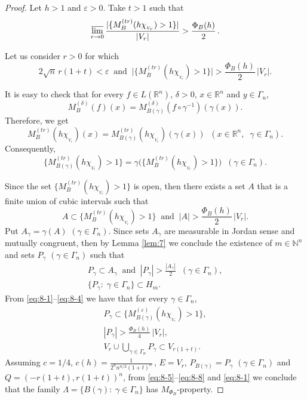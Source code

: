 \documentclass[12pt,reqno]{article}
\theoremstyle{remark}
\newcommand{\olim}{\operatornamewithlimits{\overline{lim}}}
\begin{document}
\begin{proof}
Let $h>1$ and $\varepsilon>0$. Take $t>1$ such that
$$  \olim_{r\to 0} \frac{|\{M_B^{(tr)}(h\chi_{{}_{V_r}})>1\}|}{|V_r|}>\frac{\Phi_B(h)}{2}\,.     $$

Let us consider $r>0$ for which
\begin{equation}\label{eq:8-1}
    2\sqrt{n}\,r(1+t)<\varepsilon \;\;\text{and}\;\; \big|\big\{M_B^{(tr)}(h\chi_{{}_{V_r}})>1\big\}\big|>\frac{\Phi_B(h)}{2}\,|V_r|.
\end{equation}

It is easy to check that for every $f\in L(\mathbb{R}^n)$, $\delta>0$, $x\in\mathbb{R}^n$ and $y\in \Gamma_n$,
$$  M_B^{(\delta)}(f)(x)=M_{B(\gamma)}^{(\delta)}(f\circ\gamma^{-1})(\gamma(x)).        $$
Therefore, we get
$$  M_B^{(tr)}(h\chi_{{}_{V_r}})(x)=M_{B(\gamma)}^{(tr)}(h\chi_{{}_{V_r}})(\gamma(x)) \;\; (x\in\mathbb{R}^n, \;\; \gamma\in\Gamma_n).      $$
Consequently,
\begin{equation}\label{eq:8-2}
    \big\{M_{B(\gamma)}^{(tr)}(h\chi_{{}_{V_r}})>1\big\}=\gamma\Big(\big\{M_B^{(tr)}(h\chi_{{}_{V_r}})>1\big\}\Big) \;\; (\gamma\in\Gamma_n).
\end{equation}

Since the set $\{M_B^{(tr)}(h\chi_{{}_{V_r}})>1\}$ is open, then there exists a set $A$ that is a finite union of cubic intervals such that
\begin{equation}\label{eq:8-3}
    A\subset \big\{M_B^{(tr)}(h\chi_{{}_{V_r}})>1\big\} \;\;\text{and}\;\; |A|>\frac{\Phi_B(h)}{2}\,|V_r|.
\end{equation}
Put $A_\gamma=\gamma(A)$ $(\gamma\in\Gamma_n)$. Since sets $A_\gamma$ are measurable in Jordan sense and mutually congruent, then by Lemma \ref{lem:7} we conclude the existence of $m\in\mathbb{N}^n$ and sets $P_\gamma$ $(\gamma\in\Gamma_n)$ such that
\begin{gather}
    P_\gamma\subset A_\gamma \;\;\text{and}\;\; |P_\gamma|>\frac{|A_\gamma|}{2} \;\;(\gamma\in\Gamma_n), \label{eq:8-4} \\
    \big\{P_\gamma:\;\gamma\in\Gamma_n\big\}\subset H_m. \label{eq:8-5}
\end{gather}
From \eqref{eq:8-1}--\eqref{eq:8-4} we have that for every $\gamma\in\Gamma_n$,
\begin{gather}
    P_\gamma\subset \big\{M_{B(\gamma)}^{(\varepsilon)}(h\chi_{{}_{V_r}})>1\big\}, \label{eq:8-6} \\
    |P_\gamma|>\frac{\Phi_B(h)}{4}\,|V_r|, \label{eq:8-7} \\
    V_r\cup\bigcup_{\gamma\in\Gamma_n} P_\gamma\subset V_{r(1+t)}. \label{eq:8-8}
\end{gather}
Assuming $c=1/4$, $c(h)=\frac{1}{2^n n^{n/2}(1+t)^n}$\,, $E=V_r$, $P_{B(\gamma)}=P_\gamma$ $(\gamma\in\Gamma_n)$ and $Q=(-r(1+t),r(1+t))^n$, from \eqref{eq:8-5}--\eqref{eq:8-8} and \eqref{eq:8-1} we conclude that the family $\Lambda=\{B(\gamma):\;\gamma\in\Gamma_n\}$ has $M_{\Phi_B}$-property.
\end{proof}
\end{document}
